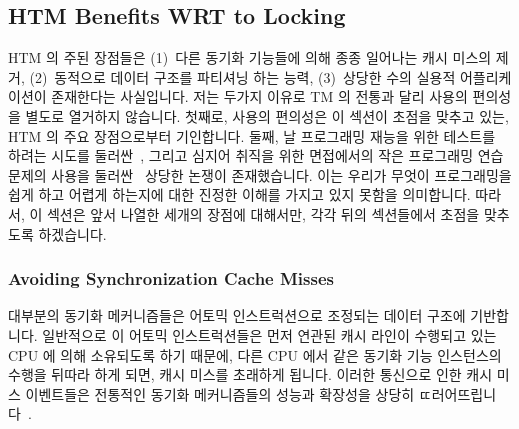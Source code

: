 \subsection{HTM Benefits WRT to Locking}
\label{sec:future:HTM Benefits WRT to Locking}

HTM 의 주된 장점들은 (1)~다른 동기화 기능들에 의해 종종 일어나는 캐시 미스의
제거, (2)~동적으로 데이터 구조를 파티셔닝 하는 능력, (3)~상당한 수의 실용적
어플리케이션이 존재한다는 사실입니다.
저는 두가지 이유로 TM 의 전통과 달리 사용의 편의성을 별도로 열거하지 않습니다.
첫째로, 사용의 편의성은 이 섹션이 초점을 맞추고 있는, HTM 의 주요 장점으로부터
기인합니다.
둘째, 날 프로그래밍 재능을 위한 테스트를 하려는 시도를
둘러싼~\cite{RichardBornat2006SheepGoats,SaeedDehnadi2009SheepGoats}, 그리고
심지어 취직을 위한 면접에서의 작은 프로그래밍 연습문제의 사용을
둘러싼~\cite{RegBraithwaite2007FizzBuzz} 상당한 논쟁이 존재했습니다.
이는 우리가 무엇이 프로그래밍을 쉽게 하고 어렵게 하는지에 대한 진정한 이해를
가지고 있지 못함을 의미합니다.
따라서, 이 섹션은 앞서 나열한 세개의 장점에 대해서만, 각각 뒤의 섹션들에서
초점을 맞추도록 하겠습니다.
\iffalse

The primary benefits of HTM are
(1)~its avoidance of the cache misses that are often incurred by
other synchronization primitives,
(2)~its ability to dynamically partition
data structures,
and (3)~the fact that it has
a fair number of practical applications.
I break from TM tradition by not listing ease of use separately
for two reasons.
First, ease of use should stem from HTM's primary benefits,
which this section focuses on.
Second, there has been considerable controversy surrounding attempts to
test for raw programming
talent~\cite{RichardBornat2006SheepGoats,SaeedDehnadi2009SheepGoats}
and even around the use of small programming exercises in job
interviews~\cite{RegBraithwaite2007FizzBuzz}.
This indicates that we really do not have a grasp on what makes
programming easy or hard.
Therefore, this section focuses on the three benefits listed above,
each in one of the following sections.
\fi

\subsubsection{Avoiding Synchronization Cache Misses}
\label{sec:future:Avoiding Synchronization Cache Misses}

대부분의 동기화 메커니즘들은 어토믹 인스트럭션으로 조정되는 데이터 구조에
기반합니다.
일반적으로 이 어토믹 인스트럭션들은 먼저 연관된 캐시 라인이 수행되고 있는 CPU
에 의해 소유되도록 하기 때문에, 다른 CPU 에서 같은 동기화 기능 인스턴스의
수행을 뒤따라 하게 되면, 캐시 미스를 초래하게 됩니다.
이러한 통신으로 인한 캐시 미스 이벤트들은 전통적인 동기화 메커니즘들의 성능과
확장성을 상당히 ㄸ러어뜨립니다~\cite[Section 4.2.3]{Anderson97}.
\iffalse

